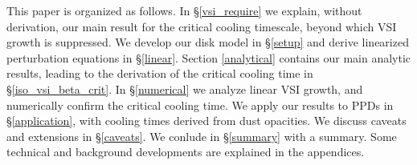 \documentclass[iop, numberedappendix]{emulateapj}
\begin{document}

This paper is organized as follows. In \S\ref{vsi_require} we explain, without derivation,  
our main result for the critical cooling timescale, beyond which VSI growth is 
suppressed. %
 We develop our disk model in \S\ref{setup} and derive linearized
 perturbation equations in  \S\ref{linear}.
 Section \ref{analytical} contains our main analytic results, leading to 
 the derivation of the critical cooling time in \S\ref{iso_vsi_beta_crit}.
 In \S\ref{numerical} we analyze linear VSI growth, and numerically confirm the critical cooling time.
We apply our results to PPDs in \S\ref{application}, with cooling times derived from dust opacities.
We discuss caveats and extensions in \S\ref{caveats}.
 We conlude in \S\ref{summary} with a summary.  Some technical and background 
 developments are explained in the appendices.  
\end{document}
